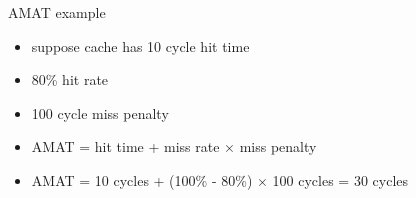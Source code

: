 \begin{frame}{AMAT example}
    \begin{itemize}
    \item suppose cache has 10 cycle hit time
    \item 80\% hit rate
    \item 100 cycle miss penalty
    \vspace{.5cm}
    \item<2-> AMAT = hit time + miss rate $\times$ miss penalty
    \item<2-> AMAT = 10 cycles + (100\% - 80\%) $\times$ 100 cycles = 30 cycles
    \end{itemize}
\end{frame}
